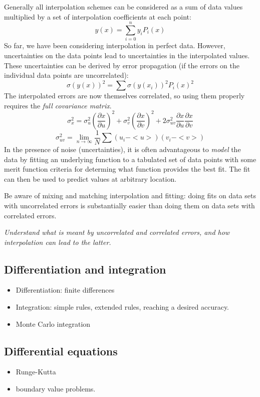 \documentclass{article}
\newcommand{\test}[1]{%
    \begin{center}
        \colorbox{hl}{\parbox{0.9\textwidth}{\emph{\centering #1}}}
    \end{center}}
\begin{document}
Generally all interpolation schemes can be considered as a sum of data
values multiplied by a set of interpolation coefficients at each
point:
\[
    y(x) = \sum_{i=0}^{n}{
        y_{i}P_{i}(x)}
    \]
So far, we have been considering interpolation in perfect data.
However, uncertainties on the data points lead to
uncertainties in the interpolated values.
These uncertainties can be derived by error propagation (if the errors on
the individual data points are uncorrelated):
\[
    \sigma(y(x))^{2} = \sum{
        \sigma(y(x_{i}))^{2} P_{i}(x)^{2}}
        \]
The interpolated errors are now themselves correlated, so using them
properly requires the \textit{full covariance matrix}.
\[
    \sigma_{x}^{2} = {
        \sigma_{u}^{2} \left( \frac{\partial{x}}{\partial{u}} \right) ^{2} +
        \sigma_{v}^{2} \left( \frac{\partial{x}}{\partial{v}} \right) ^{2} +
        2\sigma_{uv}^{2}
        \frac{\partial{x}}{\partial{u}}\frac{\partial{x}}{\partial{v}}}
    \]
\[
    \sigma_{uv}^{2} = \lim_{n\rightarrow\infty}\frac{1}{N}
    \sum{
        (u_{i} - <u>)(v_{i} - <v>)}
    \]
In the presence of noise (uncertainties), it is often advantageous to
\emph{model} the data by fitting an underlying function to a tabulated set of
data points with some merit function criteria for determing what function
provides the best fit. The fit can then be used to predict values at arbitrary
location.

Be aware of mixing and matching interpolation and fitting: doing fits on data
sets with uncorrelated errors is substantially easier than doing them on data
sets with correlated errors.

\test{Understand what is meant by uncorrelated and correlated errors, and
how interpolation can lead to the latter.}

\subsection{Differentiation and integration}
\begin{itemize}
    \item Differentiation: finite differences
    \item Integration: simple
        rules, extended rules, reaching a desired accuracy.
    \item Monte Carlo integration
\end{itemize}

\subsection{Differential equations}
\begin{itemize}
    \item Runge-Kutta
    \item boundary value problems.
\end{itemize}
\end{document}
